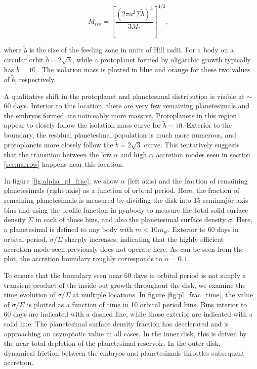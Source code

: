 \documentclass[twocolumn]{aastex63}
\begin{document}
\begin{equation}\label{eq:iso}
	M_{iso} = \left[ \frac{\left( 2 \pi a^2 \Sigma \tilde{b} \right)^3}{3 M_{*}} \right]^{1/2},
\end{equation}

\noindent where $\tilde{b}$ is the size of the feeding zone in units of Hill radii. For a body on a circular orbit $\tilde{b} = 2 \sqrt{3}$, while a protoplanet formed by oligarchic growth typically has $\tilde{b} = 10$ \citep{kokubo98}. The isolation mass is plotted in blue and orange for these two values of $\tilde{b}$, respectively.

A qualitative shift in the protoplanet and planetesimal distribution is visible at $\sim$ 60 days. Interior to this location, there are very few remaining planetesimals and the embryos formed are noticeably more massive. Protoplanets in this region appear to closely follow the isolation mass curve for $\tilde{b} = 10$. Exterior to the boundary, the residual planetesimal population is much more numerous, and protoplanets more closely follow the $\tilde{b} = 2 \sqrt{3}$ curve. This tentatively suggests that the transition between the low $\alpha$ and high $\alpha$ accretion modes seen in section \ref{sec:narrow} happens near this location.


In figure \ref{fig:alpha_pl_frac}, we show $\alpha$ (left axis) and the fraction of remaining planetesimals (right axis) as a function of orbital period. Here, the fraction of remaining planetesimals is measured by dividing the disk into 15 semimajor axis bins and using the profile function in {\sc pynbody} to measure the total solid surface density $\Sigma$ in each of those bins, and also the planetesimal surface density $\sigma$. Here, a planetesimal is defined to any body with $m < 10 m_{pl}$. Exterior to 60 days in orbital period, $\sigma/\Sigma$ sharply increases, indicating that the highly efficient accretion mode seen previously does not operate here. As can be seen from the plot, the accretion boundary roughly corresponds to $\alpha = 0.1$.


To ensure that the boundary seen near 60 days in orbital period is not simply a transient product of the inside out growth throughout the disk, we examine the time evolution of $\sigma/\Sigma$ at multiple locations. In figure \ref{fig:pl_frac_time}, the value of $\sigma/\Sigma$ is plotted as a function of time in 10 orbital period bins. Bins interior to 60 days are indicated with a dashed line, while those exterior are indicated with a solid line. The planetesimal surface density fraction has decelerated and is approaching an asymptotic value in all cases. In the inner disk, this is driven by the near-total depletion of the planetesimal reservoir. In the outer disk, dynamical friction between the embryos and planetesimals throttles subsequent accretion.
\end{document}
